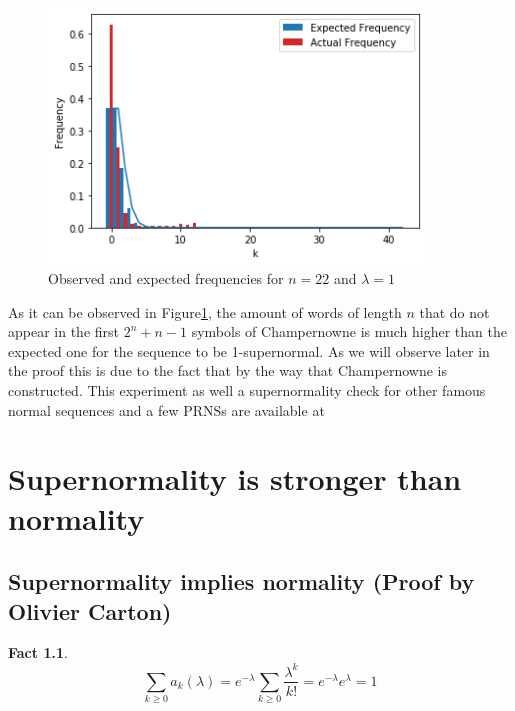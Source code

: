 \documentclass[11pt,a4paper]{tesis}
\newtheorem{fact}{Fact}[section]
\theoremstyle{definition}
\begin{document}
\begin{figure}[h]
    \includegraphics[width=10cm]{images/champ-22-freq.png}
    \centering
    \caption{Observed and expected frequencies for $n = 22$ and $\lambda = 1$}
    \label{fig:champ-22-freq}

\end{figure}

As it can be observed in Figure\ref{fig:champ-22-freq}, the amount of words of length $n$ that do not appear in the first $2^n + n - 1$ symbols of Champernowne is much higher than the expected one for the sequence to be 1-supernormal. As we will observe later in the proof this is due to the fact that by the way that Champernowne is constructed.
This experiment as well a supernormality check for other famous normal sequences and a few PRNSs are available at ~\cite{Puterman}


\chapter{Supernormality is stronger than normality}
\section{Supernormality implies normality (Proof by Olivier Carton)}



\begin{fact}
    $$\sum_{k \geq 0} a_k(\lambda) = e^{-\lambda}\sum_{k \geq 0} \frac{\lambda^k}{k!} = e^{-\lambda}e^{\lambda} = 1$$
\end{fact}
\end{document}
